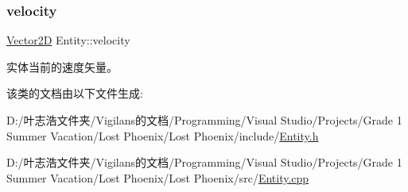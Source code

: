 \mbox{\label{class_entity_a386d25b56772b8913eb3e5adc636f6e0}} 
\subsubsection{\texorpdfstring{velocity}{velocity}}
{\footnotesize\ttfamily \hyperlink{_vector2_d_8hpp_aa1f1145650f1dd9bddf7335ec6434d7c}{Vector2D} Entity\+::velocity\hspace{0.3cm}{\ttfamily [protected]}}



实体当前的速度矢量。 



该类的文档由以下文件生成\+:\begin{DoxyCompactItemize}
\item 
D\+:/叶志浩文件夹/\+Vigilans的文档/\+Programming/\+Visual Studio/\+Projects/\+Grade 1 Summer Vacation/\+Lost Phoenix/\+Lost Phoenix/include/\hyperlink{_entity_8h}{Entity.\+h}\item 
D\+:/叶志浩文件夹/\+Vigilans的文档/\+Programming/\+Visual Studio/\+Projects/\+Grade 1 Summer Vacation/\+Lost Phoenix/\+Lost Phoenix/src/\hyperlink{_entity_8cpp}{Entity.\+cpp}\end{DoxyCompactItemize}
